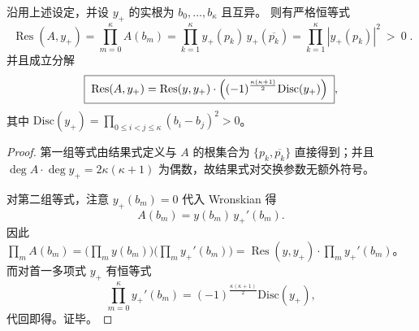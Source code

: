 

\begin{conclusion}\label{con:xi-terminal-wronskian-resultant-discriminant-factorization}
沿用上述设定，并设 \(y_{+}\) 的实根为 \(b_0,\dots,b_\kappa\) 且互异。
则有严格恒等式
\[
\boxed{\;
\operatorname{Res}(A,y_{+})
=\prod_{m=0}^{\kappa}A(b_m)
=\prod_{k=1}^{\kappa}y_{+}(p_k)\,y_{+}(\overline{p_k})
=\prod_{k=1}^{\kappa}|y_{+}(p_k)|^{2}\ >\ 0\; }.
\]
并且成立分解
\[
\boxed{\;
\operatorname{Res}(A,y_{+})
=\operatorname{Res}(y,y_{+})\cdot
\Bigl((-1)^{\frac{\kappa(\kappa+1)}{2}}\mathrm{Disc}(y_{+})\Bigr)\; },
\]
其中
\(
\mathrm{Disc}(y_{+})=\prod_{0\le i<j\le \kappa}(b_i-b_j)^2>0
\)。
\end{conclusion}
\begin{proof}
第一组等式由结果式定义与 \(A\) 的根集合为 \(\{p_k,\overline{p_k}\}\) 直接得到；并且 \(\deg A\cdot\deg y_{+}=2\kappa(\kappa+1)\) 为偶数，故结果式对交换参数无额外符号。
\par
对第二组等式，注意 \(y_{+}(b_m)=0\) 代入 Wronskian 得
\[
A(b_m)=y(b_m)\,y_{+}'(b_m).
\]
因此
\(
\prod_m A(b_m)
=\bigl(\prod_m y(b_m)\bigr)\bigl(\prod_m y_{+}'(b_m)\bigr)
=\operatorname{Res}(y,y_{+})\cdot\prod_m y_{+}'(b_m)
\)。
而对首一多项式 \(y_{+}\) 有恒等式
\[
\prod_{m=0}^{\kappa} y_{+}'(b_m)=(-1)^{\frac{\kappa(\kappa+1)}{2}}\mathrm{Disc}(y_{+}),
\]
代回即得。证毕。
\end{proof}



